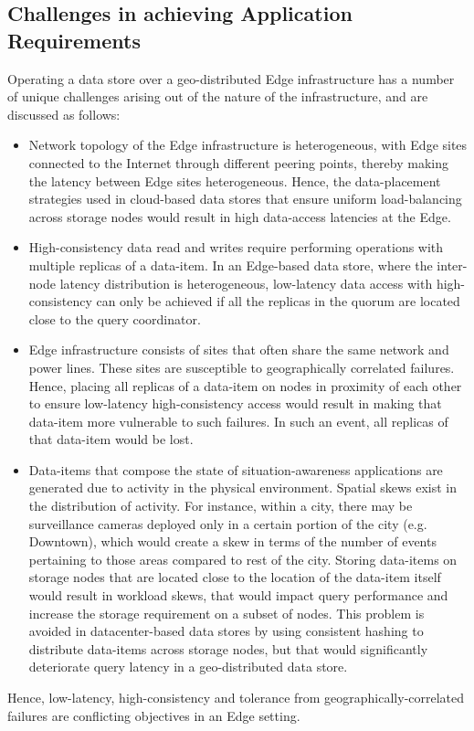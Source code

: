 \subsection{Challenges in achieving Application Requirements}
Operating a data store over a geo-distributed Edge infrastructure has a number of unique challenges arising out of the nature of the infrastructure, and are discussed as follows:
\begin{itemize}
\item Network topology of the Edge infrastructure is heterogeneous, with Edge sites connected to the Internet through different peering points, thereby making the latency between Edge sites heterogeneous. Hence, the data-placement strategies used in cloud-based data stores that ensure uniform load-balancing across storage nodes would result in high data-access latencies at the Edge.
\item High-consistency data read and writes require performing operations with multiple replicas of a data-item. In an Edge-based data store, where the inter-node latency distribution is heterogeneous, low-latency data access with high-consistency can only be achieved if all the replicas in the quorum are located close to the query coordinator.
\item Edge infrastructure consists of sites that often share the same network and power lines. These sites are susceptible to geographically correlated failures. Hence, placing all replicas of a data-item on nodes in proximity of each other to ensure low-latency high-consistency access would result in making that data-item more vulnerable to such failures. In such an event, all replicas of that data-item would be lost.
\item Data-items that compose the state of situation-awareness applications are generated due to activity in the physical environment. Spatial skews exist in the distribution of activity. For instance, within a city, there may be surveillance cameras deployed only in a certain portion of the city (e.g. Downtown), which would create a skew in terms of the number of events pertaining to those areas compared to rest of the city. Storing data-items on storage nodes that are located close to the location of the data-item itself would result in workload skews, that would impact query performance and increase the storage requirement on a subset of nodes. This problem is avoided in datacenter-based data stores by using consistent hashing \cite{consistent_hashing} to distribute data-items across storage nodes, but that would significantly deteriorate query latency in a geo-distributed data store.
\end{itemize}
Hence, low-latency, high-consistency and tolerance from geographically-correlated failures are conflicting objectives in an Edge setting.

